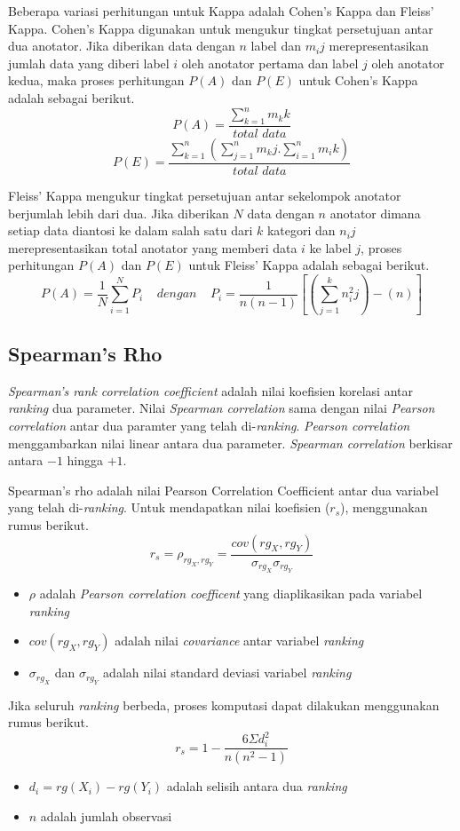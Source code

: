 Beberapa variasi perhitungan untuk Kappa adalah Cohen's Kappa dan Fleiss' Kappa. Cohen's Kappa digunakan untuk mengukur tingkat persetujuan antar dua anotator. Jika diberikan data dengan $n$ label dan $m_ij$ merepresentasikan jumlah data yang diberi label $i$ oleh anotator pertama dan label $j$ oleh anotator kedua, maka proses perhitungan $P(A)$ dan $P(E)$ untuk Cohen's Kappa adalah sebagai berikut.
\[ P(A)=\frac{\sum_{k=1}^{n} m_kk}{total\,\,data} \]
\[ P(E)=\frac{\sum_{k=1}^{n} ( \sum_{j=1}^{n} m_kj . \sum_{i=1}^{n} m_ik ) }{total\,\,data} \]

Fleiss' Kappa mengukur tingkat persetujuan antar sekelompok anotator berjumlah lebih dari dua. Jika diberikan $N$ data dengan $n$ anotator dimana setiap data diantosi ke dalam salah satu dari $k$ kategori dan $n_ij$ merepresentasikan total anotator yang memberi data $i$ ke label $j$, proses perhitungan $P(A)$ dan $P(E)$ untuk Fleiss' Kappa adalah sebagai berikut.
\[ P(A)=\frac{1}{N}\sum_{i=1}^{N}P_i \:\:\:\:\:dengan\:\:\:\:\: P_i=\frac{1}{n(n-1)}[(\sum_{j=1}^{k}n^2_ij)-(n)] \]

\subsection{Spearman's Rho}
\textit{Spearman's rank correlation coefficient} adalah nilai koefisien korelasi antar \textit{ranking} dua parameter. Nilai \textit{Spearman correlation} sama dengan nilai \textit{Pearson correlation} antar dua paramter yang telah di-\textit{ranking}. \textit{Pearson correlation}  menggambarkan nilai linear antara dua parameter. \textit{Spearman correlation} berkisar antara $-1$ hingga $+1$.

Spearman's rho adalah nilai Pearson Correlation Coefficient antar dua variabel yang telah di-\textit{ranking}. Untuk mendapatkan nilai koefisien ($r_s$), menggunakan rumus berikut.
\[ r_s = \rho_{rg_X,rg_Y} = \frac{cov(rg_X,rg_Y)}{\sigma_{rg_X}\sigma_{rg_Y}} \]
\begin{itemize}
  \item $\rho$ adalah \textit{Pearson correlation coefficent} yang diaplikasikan pada variabel \textit{ranking}
  \item $cov(rg_X,rg_Y)$ adalah nilai \textit{covariance} antar variabel \textit{ranking}
  \item $\sigma_{rg_X}$ dan $\sigma_{rg_Y}$ adalah nilai standard deviasi variabel \textit{ranking}
\end{itemize}
Jika seluruh \textit{ranking} berbeda, proses komputasi dapat dilakukan menggunakan rumus berikut.
\[ r_s = 1-\frac{6 \Sigma d_i^2}{n(n^2-1)} \]
\begin{itemize}
  \item $d_i = rg(X_i)-rg(Y_i)$ adalah selisih antara dua \textit{ranking}
  \item $n$ adalah jumlah observasi
\end{itemize}




